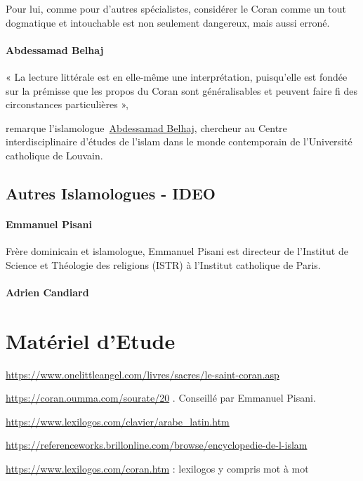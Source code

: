 Pour lui, comme pour d'autres spécialistes, considérer le Coran comme un
tout dogmatique et intouchable est non seulement dangereux, mais aussi
erroné.

\paragraph{Abdessamad
Belhaj}
\begin{cite}
« La lecture littérale est en elle-même une
interprétation, puisqu'elle est fondée sur la prémisse que les propos du
Coran sont généralisables et peuvent faire fi des circonstances
particulières »,~
\end{cite}
remarque
l'islamologue~{\underline{Abdessamad
Belhaj}}, chercheur au Centre interdisciplinaire d'études de l'islam
dans le monde contemporain de l'Université catholique de Louvain.

\subsection{Autres Islamologues - IDEO}
\paragraph{Emmanuel Pisani}
Frère dominicain et islamologue, Emmanuel Pisani est directeur de l’Institut de Science et Théologie des religions (ISTR) à l’Institut catholique de Paris.

\paragraph{Adrien Candiard}



\section{Matériel d'Etude}\label{matuxe9riel}

\url{https://www.onelittleangel.com/livres/sacres/le-saint-coran.asp}

\url{https://coran.oumma.com/sourate/20} . Conseillé par Emmanuel
Pisani.

\url{https://www.lexilogos.com/clavier/arabe_latin.htm}

\url{https://referenceworks.brillonline.com/browse/encyclopedie-de-l-islam}

\url{https://www.lexilogos.com/coran.htm} : lexilogos y compris mot à
mot




